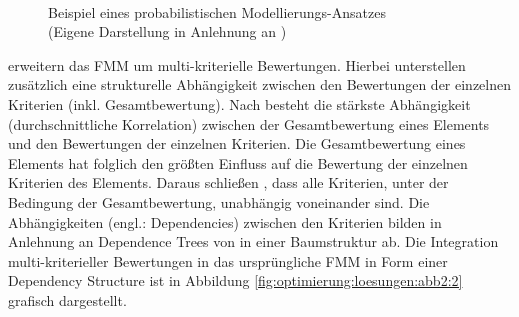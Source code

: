 \begin{figure}
    \centering
    \\
  \caption[Beispiel eines probabilistischen Modellierungs-Ansatzes]{Beispiel eines probabilistischen Modellierungs-Ansatzes\\
	(Eigene Darstellung in Anlehnung an \cite[S. 836]{adomavicius:4:inbook})}\label{fig:optimierung:loesungen:abb2}
\end{figure}

\textcite[S. 235]{sahoo:article} erweitern das \ac{FMM} um multi-kriterielle Bewertungen.
Hierbei unterstellen \textcite[S. 236f.]{sahoo:article} zusätzlich eine strukturelle Abhängigkeit zwischen den Bewertungen der einzelnen Kriterien (inkl. Gesamtbewertung).
Nach \textcite[S. 236f.]{sahoo:article} besteht die stärkste Abhängigkeit (durchschnittliche Korrelation) zwischen der Gesamtbewertung eines Elements und den Bewertungen der einzelnen Kriterien.
Die Gesamtbewertung eines Elements hat folglich den größten Einfluss auf die Bewertung der einzelnen Kriterien des Elements.
Daraus schließen \textcite[S. 236f.]{sahoo:article}, dass alle Kriterien, unter der Bedingung der Gesamtbewertung, unabhängig voneinander sind.
Die Abhängigkeiten (engl.: Dependencies) zwischen den Kriterien bilden \textcite[S. 235]{sahoo:article} in Anlehnung an Dependence Trees von \textcite[S. 463]{chow:article} in einer Baumstruktur ab.
Die Integration multi-kriterieller Bewertungen in das ursprüngliche \ac{FMM} in Form einer Dependency Structure ist in Abbildung \ref{fig:optimierung:loesungen:abb2:2} grafisch dargestellt.

